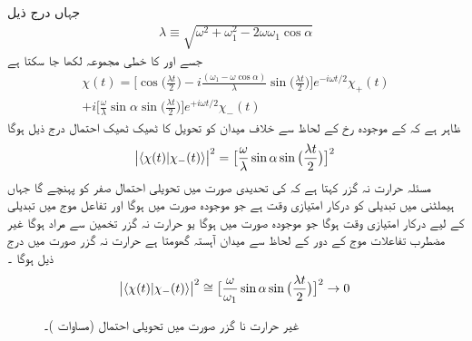 جہاں  درج ذیل 
\begin{align}
\lambda \equiv \sqrt{\omega^2 + \omega_1^2 - 2 \omega \omega_1 \cos \alpha}
\end{align}
جسے  اور  کا خطی مجموعہ لکھا جا سکتا ہے 
\begin{multline}
\chi (t) = \big [ \cos\big ( \frac{\lambda t}{2} \big ) - i \frac{(\omega_1 - \omega \cos \alpha)}{\lambda} \sin\big ( \frac{\lambda t}{2} \big ) \big ] e^{- i \omega t/2} \chi_{+} (t) \\
+ i \big [ \frac{\omega}{\lambda} \sin \alpha \sin \big ( \frac{\lambda t}{2} \big ) \big ] e^{+ i \omega t/2} \chi_- (t)
\end{multline}
ظاہر ہے کہ  کے موجودہ رخ کے لحاظ سے خلاف میدان کو تحویل کا ٹھیک ٹھیک احتمال درج ذیل ہوگا 
\begin{align}
\abs{\langle \chi (t) | \chi_{-} (t) \rangle}^2 = \big [ \frac{\omega}{\lambda} \sin \alpha \sin \big ( \frac{\lambda t}{2} \big ) \big ]^2
\end{align}
مسئلہ حرارت نہ گزر کہتا ہے کہ  کی تحدیدی صورت میں تحویلی احتمال صفر کو پہنچے گا جہاں ہيملٹنی میں تبدیلی کو درکار امتیازی وقت  ہے جو موجودہ صورت میں  ہوگا اور تفاعل موج میں تبدیلی کے لیے درکار امتیازی وقت  ہوگا جو موجودہ صورت میں  ہوگا یو حرارت نہ گزر تخمین سے مراد  ہوگا غیر مضطرب تفاعلات موج کے دور کے لحاظ سے میدان آہستہ گھومتا ہے حرارت نہ گزر صورت  میں درج ذیل ہوگا ۔
\begin{align}
\abs{\langle \chi (t) | \chi_{-} (t) \rangle}^2 \cong \big [ \frac{\omega}{\omega_1} \sin \alpha \sin \big ( \frac{\lambda t}{2} \big ) \big ]^2 \to 0
\end{align}
%
\begin{figure}
\centering
{}
\caption{غیر حرارت نا گزر صورت      میں تحویلی  احتمال  (مساوات )۔}
\label{شکل_حرارت_نا_گزر_تحویلی_احتمال}
\end{figure}

